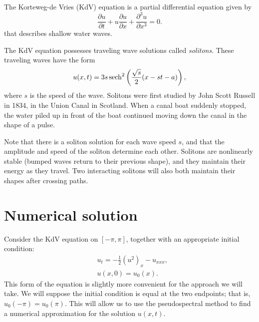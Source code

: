 \label{lab:solitons}


The Korteweg-de Vries (KdV) equation is a partial differential equation given by
\[  \frac{\partial u }{\partial t} + u \frac{\partial u}{\partial x} + \frac{\partial^3 u}{\partial x^3} = 0.
\]
that describes shallow water waves.

The KdV equation possesses traveling wave solutions called \emph{solitons}.
These traveling waves have the form
\[ u(x,t) = 3s \operatorname{sech}^2\left(\frac{\sqrt{s}}{2}(x - st - a)\right),
\]
where $s$ is the speed of the wave.
Solitons were first studied by John Scott Russell in 1834, in the Union Canal in Scotland.
When a canal boat suddenly stopped, the water piled up in front of the boat continued moving down the canal in the shape of a pulse.

Note that there is a soliton solution for each wave speed $s$, and that the amplitude and speed of the soliton determine each other.
Solitons are nonlinearly stable (bumped waves return to their previous shape), and they maintain their energy as they travel.
Two interacting solitons will also both maintain their shapes after crossing paths.

\section*{Numerical solution}
Consider the KdV equation on $[-\pi,\pi]$, together with an appropriate initial condition:
\begin{align*}
	 &{ }u_t = -\frac{1}{2}\left(u^2 \right)_x - u_{xxx},\\
     &{ }u(x,0) = u_0(x).
\end{align*}
This form of the equation is slightly more convenient for the approach we will take.
We will suppose the initial condition is equal at the two endpoints; that is, \(u_0(-\pi)=u_0(\pi)\).
This will allow us to use the pseudospectral method to find a numerical approximation for the solution $u(x,t)$.

